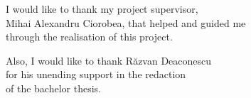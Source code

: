 \vspace*{7cm}
\begin{center}
I would like to thank my project supervisor,\\
Mihai Alexandru Ciorobea, that helped and guided me\\
through the realisation of this project.\\
\end{center}
\vspace{0.6cm}
\begin{center}
Also, I would like to thank Răzvan Deaconescu\\
for his unending support in the redaction\\
of the bachelor thesis.\\
\end{center}